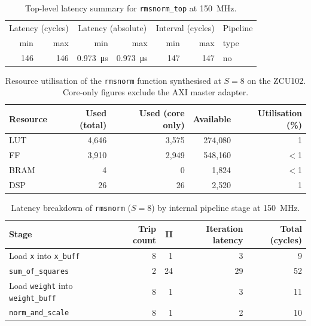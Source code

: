 \begin{table}[H]
  \centering
  \begin{tabular}{rrrrrrl}
    \toprule
    \multicolumn{2}{c}{Latency (cycles)} &
    \multicolumn{2}{c}{Latency (absolute)} &
    \multicolumn{2}{c}{Interval (cycles)} & Pipeline \\
    min & max & min & max & min & max & type \\
    \midrule
    146 & 146 & \SI{0.973}{\micro\second} & \SI{0.973}{\micro\second} & 147 & 147 & no \\
    \bottomrule
  \end{tabular}
  \caption{Top-level latency summary for \texttt{rmsnorm\_top} at
           \SI{150}{\mega\hertz}.}
  \label{tab:rmsnorm_top_latency}

\end{table}

\begin{table}[H]
  \centering
  \begin{tabular}{lrrrr}
    \toprule
    Resource & Used (total) & Used (core only) & Available & Utilisation (\%) \\
    \midrule
    LUT      & 4{,}646 & 3{,}575 & 274{,}080 & 1 \\
    FF       & 3{,}910 & 2{,}949 & 548{,}160 & $<$1 \\
    BRAM     & 4       & 0       & 1{,}824   & $<$1 \\
    DSP      & 26      & 26      & 2{,}520   & 1 \\
    \bottomrule
  \end{tabular}
  \caption{Resource utilisation of the \texttt{rmsnorm} function
           synthesised at $S = 8$ on the ZCU102. Core-only figures
           exclude the AXI master adapter.}
  \label{tab:rmsnorm_resources}

\end{table}

\begin{table}[H]
  \centering
  \begin{tabular}{lrrrr}
    \toprule
    Stage & Trip count & II & Iteration latency & Total (cycles) \\
    \midrule
    Load \texttt{x} into \texttt{x\_buff}           & 8 &  1 &  3 &  9 \\
    \texttt{sum\_of\_squares}                        & 2 & 24 & 29 & 52 \\
    Load \texttt{weight} into \texttt{weight\_buff}  & 8 &  1 &  3 & 11 \\
    \texttt{norm\_and\_scale}                        & 8 &  1 &  2 & 10 \\
    \bottomrule
  \end{tabular}
  \caption{Latency breakdown of \texttt{rmsnorm} ($S = 8$) by internal
           pipeline stage at \SI{150}{\mega\hertz}.}
  \label{tab:rmsnorm_latency}

\end{table}

